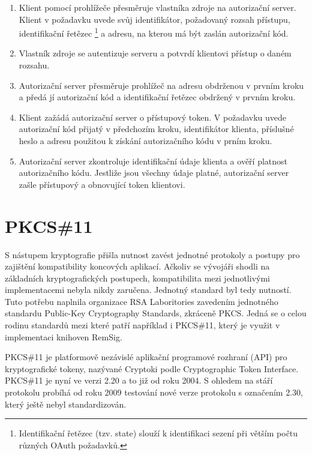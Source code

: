 \documentclass[]{fithesis3}
\begin{document}
	\begin{enumerate}
		\item {
		Klient pomocí prohlížeče přesměruje vlastníka zdroje na autorizační server. Klient v 				požadavku uvede svůj identifikátor, požadovaný rozsah přístupu,  identifikační řetězec
			\footnote {
			Identifikační řetězec (tzv. state) slouží k identifikaci sezení při větším počtu různých 				OAuth požadavků.
			}	 
		a adresu, na kterou má být zaslán autorizační kód.
		}
		\item
		Vlastník zdroje se autentizuje serveru a potvrdí klientovi přístup o daném rozsahu.
		\item
		Autorizační server přesměruje prohlížeč na adresu obdrženou v prvním kroku a předá jí 			autorizační kód a identifikační řetězec obdržený v prvním kroku.
		\item
		Klient zažádá autorizační server o přístupový token. V požadavku uvede autorizační kód 			přijatý v předchozím kroku, identifikátor klienta, příslušné heslo a adresu použitou k 				získání autorizačního kódu v prním kroku. 
		\item	
		Autorizační server zkontroluje identifikační údaje klienta a ověří platnost autorizačního 				kódu. Jestliže jsou všechny údaje platné, autorizační server zašle přístupový a obnovující 			token klientovi.

	\end{enumerate}

\chapter{PKCS\#11}

S nástupem kryptografie přišla nutnost zavést jednotné protokoly a postupy pro zajištění kompatibility koncových aplikací. Ačkoliv se vývojáři shodli na základních kryptografických postupech, kompatibilita mezi jednotlivými implementacemi nebyla nikdy zaručena. Jednotný standard byl tedy nutností. Tuto potřebu naplnila organizace RSA Laboritories zavedením jednotného standardu Public-Key Cryptography Standards, zkráceně PKCS. Jedná se o celou rodinu standardů mezi které patří například i PKCS\#11, který je využit v implementaci knihoven RemSig.

PKCS\#11 je platformově nezávislé aplikační programové rozhraní (API) pro kryptografické tokeny, nazývané Cryptoki podle Cryptographic Token Interface. PKCS\#11 je nyní ve verzi 2.20 a to již od roku 2004. S ohledem na stáří protokolu probíhá od roku 2009 testování nové verze protokolu s označením 2.30, který ještě nebyl standardizován.
\end{document}
